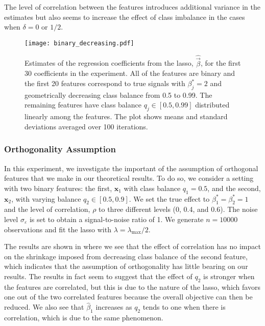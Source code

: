 The level of correlation between the features introduces additional variance in the
estimates but also seems to increase the effect of class imbalance in the cases when
\(\delta = 0\) or \(1/2\).

\begin{figure}[htpb]
  \centering
  \texttt{[image: binary\_decreasing.pdf]}
  \caption{%
    Estimates of the regression coefficients from the lasso, \(\hat{\vec{\beta}}\), for the
    first 30 coefficients in the experiment. All of the features are binary and the first 20
    features correspond to true signals with \(\beta_j^* = 2\) and geometrically decreasing
    class balance from 0.5 to 0.99. The remaining features have class balance \(q_j \in [0.5,
      0.99]\) distributed linearly among the features. The plot shows means and standard
    deviations averaged over 100 iterations.
  }
  \label{fig:binary-decreasing-full}
\end{figure}

\subsubsection{Orthogonality Assumption}
\label{sec:orthogonality-assumption}

In this experiment, we investigate the important of the assumption of orthogonal features
that we make in our theoretical results. To do so, we consider a setting with two binary
features: the first, \(\bm{x}_1\) with class balance \(q_1 = 0.5\), and the second,
\(\bm{x}_2\), with varying balance \(q_2 \in [0.5, 0.9]\). We set the true effect to
\(\beta_1^* = \beta_2^* = 1\) and the level of correlation, \(\rho\) to three different
levels (0, 0.4, and 0.6). The noise level \(\sigma_\varepsilon\) is set to obtain a
signal-to-noise ratio of 1. We generate \(n=\num{10000}\) observations and fit the lasso
with \(\lambda = \lambda_\text{max}/2\).

The results are shown in  where we see that the effect of
correlation has no impact on the shrinkage imposed from decreasing class balance of the
second feature, which indicates that the assumption of orthogonality has little bearing on
our results. The results in fact seem to suggest that the effect of \(q_2\) is stronger
when the features are correlated, but this is due to the nature of the lasso, which favors
one out of the two correlated features because the overall objective can then be reduced.
We also see that \(\hat{\beta}_1\) increases as \(q_2\) tends to one when there is
correlation, which is due to the same phenomenon.

